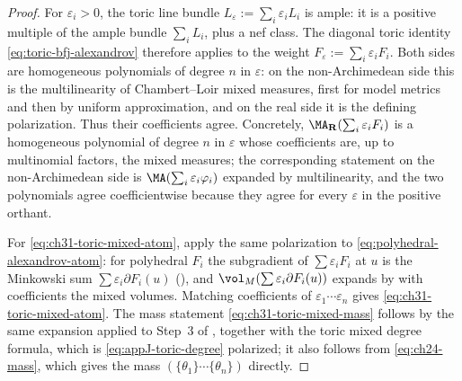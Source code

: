 \begin{proof}
For \(\varepsilon_i>0\), the toric line bundle
\(L_\varepsilon:=\sum_i\varepsilon_iL_i\) is ample: it is a positive
multiple of the ample bundle \(\sum_iL_i\), plus a nef class.  The diagonal
toric identity \eqref{eq:toric-bfj-alexandrov} therefore applies to the
weight \(F_\varepsilon:=\sum_i\varepsilon_iF_i\).  Both sides are
homogeneous polynomials of degree \(n\) in \(\varepsilon\): on the
non-Archimedean side this is the multilinearity of Chambert--Loir mixed
measures, first for model metrics and then by uniform approximation, and on
the real side it is the defining polarization.  Thus their coefficients
agree.  Concretely,
\(\MA_{\mathbf R}(\sum_i\varepsilon_iF_i)\) is a homogeneous polynomial of
degree \(n\) in \(\varepsilon\) whose coefficients are, up to multinomial
factors, the mixed measures; the corresponding statement on the
non-Archimedean side is \(\MA(\sum_i\varepsilon_i\varphi_i)\) expanded by
multilinearity, and the two polynomials agree coefficientwise because they
agree for every \(\varepsilon\) in the positive orthant.

For \eqref{eq:ch31-toric-mixed-atom}, apply the same polarization to
\eqref{eq:polyhedral-alexandrov-atom}: for polyhedral \(F_i\) the
subgradient of \(\sum\varepsilon_iF_i\) at \(u\) is the Minkowski sum
\(\sum\varepsilon_i\partial F_i(u)\) (), and
\(\vol_M(\sum\varepsilon_i\partial F_i(u))\) expands by
 with coefficients the mixed volumes.
Matching coefficients of \(\varepsilon_1\cdots\varepsilon_n\) gives
\eqref{eq:ch31-toric-mixed-atom}.  The mass statement
\eqref{eq:ch31-toric-mixed-mass} follows by the same expansion applied to
Step~3 of , together with the toric mixed
degree formula, which is \eqref{eq:appJ-toric-degree} polarized; it also
follows from \eqref{eq:ch24-mass}, which gives the mass
\((\{\theta_1\}\cdots\{\theta_n\})\) directly.
\end{proof}

